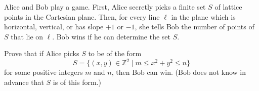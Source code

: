 Alice and Bob play a game. First, Alice secretly picks a finite set $S$ of lattice points in the Cartesian plane. Then, for every line $\ell$ in the plane which is horizontal, vertical, or has slope $+1$ or $-1$, she tells Bob the number of points of $S$ that lie on $\ell$. Bob wins if he can determine the set $S$.

Prove that if Alice picks $S$ to be of the form \[S = \{(x, y) \in \mathbb{Z}^2 \mid m \le x^2 + y^2 \le n\}\] for some positive integers $m$ and $n$, then Bob can win. (Bob does not know in advance that $S$ is of this form.)